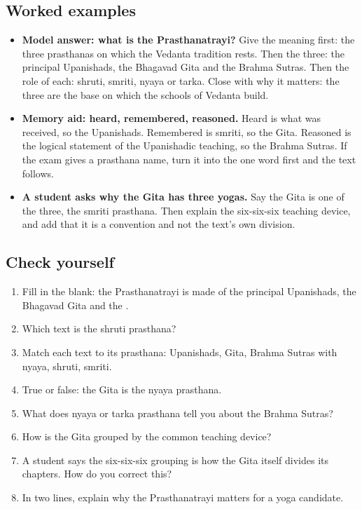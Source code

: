 \subsection*{Worked examples}
\begin{itemize}
\item \textbf{Model answer: what is the Prasthanatrayi?} Give the meaning first: the three prasthanas on which the Vedanta tradition rests. Then the three: the principal Upanishads, the Bhagavad Gita and the Brahma Sutras. Then the role of each: shruti, smriti, nyaya or tarka. Close with why it matters: the three are the base on which the schools of Vedanta build.
\item \textbf{Memory aid: heard, remembered, reasoned.} Heard is what was received, so the Upanishads. Remembered is smriti, so the Gita. Reasoned is the logical statement of the Upanishadic teaching, so the Brahma Sutras. If the exam gives a prasthana name, turn it into the one word first and the text follows.
\item \textbf{A student asks why the Gita has three yogas.} Say the Gita is one of the three, the smriti prasthana. Then explain the six-six-six teaching device, and add that it is a convention and not the text's own division.
\end{itemize}

\subsection*{Check yourself}
\begin{enumerate}
\item Fill in the blank: the Prasthanatrayi is made of the principal Upanishads, the Bhagavad Gita and the \underline{\hspace{2cm}}.
\item Which text is the shruti prasthana?
\item Match each text to its prasthana: Upanishads, Gita, Brahma Sutras with nyaya, shruti, smriti.
\item True or false: the Gita is the nyaya prasthana.
\item What does nyaya or tarka prasthana tell you about the Brahma Sutras?
\item How is the Gita grouped by the common teaching device?
\item A student says the six-six-six grouping is how the Gita itself divides its chapters. How do you correct this?
\item In two lines, explain why the Prasthanatrayi matters for a yoga candidate.
\end{enumerate}

